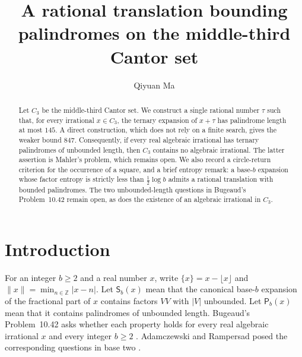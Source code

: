 \documentclass[11pt,reqno,a4paper]{amsart}
\title[A rational translation of the middle-third Cantor set]
{A rational translation bounding palindromes on the middle-third Cantor set}
\date{}
\theoremstyle{remark}
\newcommand{\Z}{\mathbb Z}
\newcommand{\dist}[1]{\lVert#1\rVert}
\begin{document}
\author[Qiyuan Ma]{Qiyuan Ma\\[6pt]\protect\usebox{\affilbox}}

\begin{abstract}
Let $C_3$ be the middle-third Cantor set. We construct a single rational number $\tau$ such that, for every irrational $x\in C_3$, the ternary expansion of $x+\tau$ has palindrome length at most $145$. A direct construction, which does not rely on a finite search, gives the weaker bound $847$. Consequently, if every real algebraic irrational has ternary palindromes of unbounded length, then $C_3$ contains no algebraic irrational. The latter assertion is Mahler's problem, which remains open. We also record a circle-return criterion for the occurrence of a square, and a brief entropy remark: a base-$b$ expansion whose factor entropy is strictly less than $\tfrac12\log b$ admits a rational translation with bounded palindromes. The two unbounded-length questions in Bugeaud's Problem~10.42 remain open, as does the existence of an algebraic irrational in $C_3$.
\end{abstract}
\maketitle

\section{Introduction}\label{sec:intro}

For an integer $b\ge2$ and a real number $x$, write $\{x\}=x-\lfloor x\rfloor$ and $\dist{x}=\min_{n\in\Z}|x-n|$. Let $\mathsf S_b(x)$ mean that the canonical base-$b$ expansion of the fractional part of $x$ contains factors $VV$ with $|V|$ unbounded. Let $\mathsf P_b(x)$ mean that it contains palindromes of unbounded length. Bugeaud's Problem~10.42 asks whether each property holds for every real algebraic irrational $x$ and every integer $b\ge2$ \cite[p.~220]{Bugeaud}. Adamczewski and Rampersad posed the corresponding questions in base two \cite{AR}.
\end{document}
